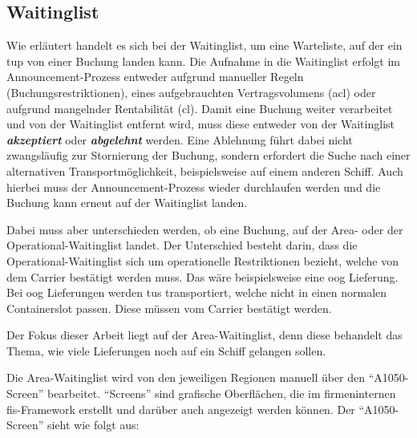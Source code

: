 \subsection{Waitinglist}



Wie erläutert handelt es sich bei der Waitinglist, um eine Warteliste, auf der ein \gls{tup} von einer Buchung landen kann. 
Die Aufnahme in die Waitinglist erfolgt im Announcement-Prozess entweder aufgrund manueller Regeln (Buchungsrestriktionen), eines aufgebrauchten Vertragsvolumens (\gls{acl}) oder aufgrund mangelnder Rentabilität (\gls{cl}).
Damit eine Buchung weiter verarbeitet und von der Waitinglist entfernt wird, muss diese entweder von der Waitinglist \textit{\textbf{akzeptiert}} oder \textit{\textbf{abgelehnt}} werden. 
Eine Ablehnung führt dabei nicht zwangsläufig zur Stornierung der Buchung, sondern erfordert die Suche nach einer alternativen Transportmöglichkeit, beispielsweise auf einem anderen Schiff.
Auch hierbei muss der Announcement-Prozess wieder durchlaufen werden und die Buchung kann erneut auf der Waitinglist landen.

Dabei muss aber unterschieden werden, ob eine Buchung, auf der Area- oder der Operational-Waitinglist landet. Der Unterschied besteht darin, dass die Operational-Waitinglist sich um operationelle Restriktionen bezieht, welche von dem Carrier bestätigt werden muss. Das wäre beispielsweise eine \gls{oog} Lieferung.
Bei \gls{oog} Lieferungen werden \glspl{tu} transportiert, welche nicht in einen normalen Containerslot passen. Diese müssen vom Carrier bestätigt werden. 

Der Fokus dieser Arbeit liegt auf der Area-Waitinglist, denn diese behandelt das Thema, wie viele Lieferungen noch auf ein Schiff gelangen sollen.

Die Area-Waitinglist wird von den jeweiligen Regionen manuell über den \enquote{A1050-Screen} bearbeitet. \enquote{Screens} sind grafische Oberflächen, die im firmeninternen \gls{fis}-Framework erstellt und darüber auch angezeigt werden können. 
Der \enquote{A1050-Screen} sieht wie folgt aus:

